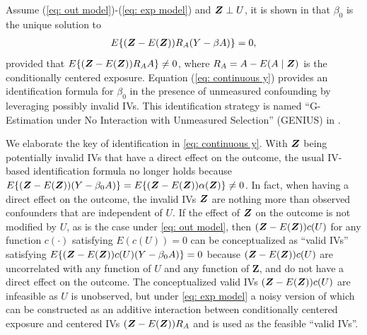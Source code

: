 \documentclass[12pt]{article}
\begin{document}
Assume (\ref{eq: out model})-(\ref{eq: exp model}) and $ \bm{Z}\perp U $, it is shown in \cite{Tchetgen2019_GENIUS} that $ \beta_0 $ is the unique solution to 
\begin{align}
	E\{ (\bm{Z}- E(\bm{Z}))R_A (Y- \beta A)\}=0, \label{eq: continuous y}
\end{align}
provided that $E\{(\bm{Z}- E(\bm{Z})) R_A A\}\neq 0 $, where $ R_A=A- E(A\mid \bm{Z}) $ is the conditionally centered exposure. Equation (\ref{eq: continuous y})  provides an identification formula for $ \beta_0 $ in the presence of unmeasured confounding by leveraging possibly invalid IVs. This identification strategy is named ``G-Estimation under No
	Interaction with Unmeasured Selection'' (GENIUS) in \cite{Tchetgen2019_GENIUS}. 




We elaborate the key of identification in \eqref{eq: continuous y}. With $ \bm{Z} $ being potentially invalid IVs that have a direct effect on the outcome, the usual IV-based identification formula no longer holds because $ E\{ (\bm{Z}-E(\bm{Z})) (Y-\beta_0 A)\}=E\{ (\bm{Z}-E(\bm{Z}))  \alpha(\bm{Z})\} \neq 0 $.   In fact, when having a direct effect on the outcome,  the invalid IVs $ \bm{Z} $ are nothing more than observed confounders that are independent of $ U $. If the effect of $ \bm{Z} $ on the outcome is not modified by $ U $, as is the case under  \eqref{eq: out model}, then $  (\bm{Z}- E(\bm{Z}))  c(U) $ for any function $ c(\cdot) $ satisfying $ E(c(U)) = 0$ can be conceptualized as ``valid IVs'' satisfying $E\{  (\bm{Z}- E(\bm{Z}))  c(U)  (Y- \beta_0A) \} = 0$ because 
$  (\bm{Z}- E(\bm{Z}))  c(U)    $ are uncorrelated with any function of $ U $ and any function of $  \bm Z$, and do not have a direct effect on the outcome.  The conceptualized valid IVs $  (\bm{Z}- E(\bm{Z}))  c(U)  $  are infeasible as $ U $ is unobserved, but under \eqref{eq: exp model} a noisy version of which can be constructed as an additive interaction between conditionally centered exposure and centered IVs $ (\bm{Z}- E(\bm{Z})) R_A$  and is used as the feasible ``valid IVs''. 
\end{document}
